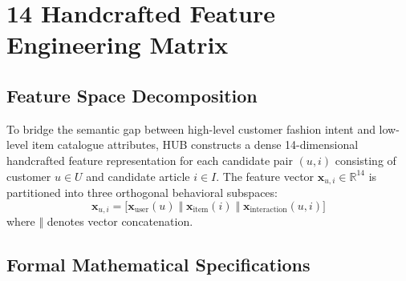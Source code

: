 \section{14 Handcrafted Feature Engineering Matrix}

\subsection{Feature Space Decomposition}
To bridge the semantic gap between high-level customer fashion intent and low-level item catalogue attributes, HUB constructs a dense 14-dimensional handcrafted feature representation for each candidate pair $(u, i)$ consisting of customer $u \in U$ and candidate article $i \in I$. The feature vector $\mathbf{x}_{u,i} \in \mathbb{R}^{14}$ is partitioned into three orthogonal behavioral subspaces:
\begin{equation}
    \mathbf{x}_{u,i} = \big[ \mathbf{x}_{\text{user}}(u) \;\Vert\; \mathbf{x}_{\text{item}}(i) \;\Vert\; \mathbf{x}_{\text{interaction}}(u, i) \big]
\end{equation}
where $\Vert$ denotes vector concatenation.

\subsection{Formal Mathematical Specifications}

